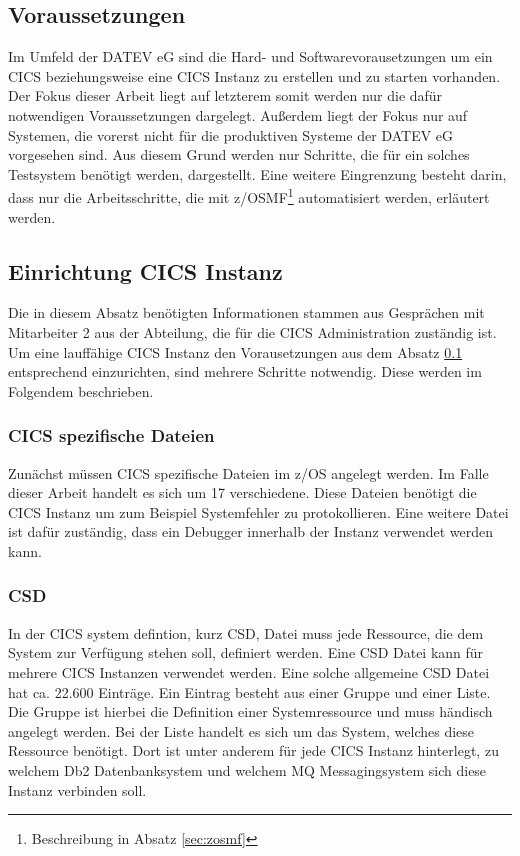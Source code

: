 \subsection{Voraussetzungen}\label{subsec:voraus}
Im Umfeld der DATEV eG sind die Hard- und Softwarevorausetzungen um ein CICS beziehungsweise eine CICS Instanz zu erstellen und zu starten vorhanden.
Der Fokus dieser Arbeit liegt auf letzterem somit werden nur die dafür notwendigen Voraussetzungen dargelegt.
Außerdem liegt der Fokus nur auf Systemen, die vorerst nicht für die produktiven Systeme der DATEV eG vorgesehen sind.
Aus diesem Grund werden nur Schritte, die für ein solches Testsystem benötigt werden, dargestellt.
Eine weitere Eingrenzung besteht darin, dass nur die Arbeitsschritte, die mit z/OSMF\footnote{Beschreibung in Absatz \ref{sec:zosmf}} automatisiert werden, erläutert werden.

\subsection{Einrichtung CICS Instanz}\label{subsec:createCICS}
Die in diesem Absatz benötigten Informationen stammen aus Gesprächen mit Mitarbeiter 2 aus der Abteilung, die für die CICS Administration zuständig ist.
Um eine lauffähige CICS Instanz den Vorausetzungen aus dem Absatz \ref{subsec:voraus} entsprechend einzurichten, sind mehrere Schritte notwendig.
Diese werden im Folgendem beschrieben.

\subsubsection{CICS spezifische Dateien}\label{sssec:speziDat}
Zunächst müssen CICS spezifische Dateien im z/OS angelegt werden.
Im Falle dieser Arbeit handelt es sich um 17 verschiedene.
Diese Dateien benötigt die CICS Instanz um zum Beispiel Systemfehler zu protokollieren.
Eine weitere Datei ist dafür zuständig, dass ein Debugger innerhalb der Instanz verwendet werden kann.

\subsubsection{CSD}
In der CICS system defintion, kurz CSD, Datei muss jede Ressource, die dem System zur Verfügung stehen soll, definiert werden.
Eine CSD Datei kann für mehrere CICS Instanzen verwendet werden.
Eine solche allgemeine CSD Datei hat ca. 22.600 Einträge.
Ein Eintrag besteht aus einer Gruppe und einer Liste.
Die Gruppe ist hierbei die Definition einer Systemressource und muss händisch angelegt werden.
Bei der Liste handelt es sich um das System, welches diese Ressource benötigt.
Dort ist unter anderem für jede CICS Instanz hinterlegt, zu welchem Db2 Datenbanksystem und welchem MQ Messagingsystem sich diese Instanz verbinden soll.

